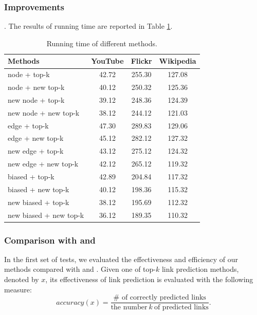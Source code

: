 {\subsubsection{Improvements}
. The results of running time are reported in Table \ref{tab_improvements}. \\
\begin{table}
\caption{Running time of different methods.}
\label{tab_improvements}
\vspace{-2ex}
\centering
\newcommand{\tabincell}[2]{\begin{tabular}{@{}#1@{}}#2\end{tabular}}
\begin{tabular}{l|c|c|c}
\hline \hline Methods & YouTube & Flickr & Wikipedia  \\
\hline \hline
node + top-k & 42.72 & 255.30 & 127.08 \\
node + new top-k & 40.12 & 250.32 & 125.36 \\
new node + top-k & 39.12 & 248.36 & 124.39 \\
new node + new top-k & 38.12 & 244.12 & 121.03 \\
\hline
edge + top-k & 47.30 & 289.83 & 129.06 \\
edge + new top-k & 45.12 & 282.12 & 127.32 \\
new edge + top-k & 43.12 & 275.12 & 124.32 \\
new edge + new top-k & 42.12 & 265.12 & 119.32 \\
\hline
biased + top-k & 42.89 & 204.84 & 117.32 \\
biased + new top-k & 40.12 & 198.36 & 115.32 \\
new biased + top-k & 38.12 & 195.69 & 112.32 \\
new biased + new top-k & 36.12 & 189.35 & 110.32 \\
\hline \hline
\end{tabular}
\end{table} }


\subsubsection{Comparison with \Aa and \BIGCLAM }



In the first set of tests,
we evaluated the effectiveness and efficiency of our methods compared with \Aa and
\BIGCLAM. Given one of top-$k$ link prediction methods, denoted by $x$, its effectiveness
of link prediction is evaluated with the following measure:
\begin{equation}
accuracy(x) = \frac{\# \textrm{ of correctly predicted links}}{\textrm{the number} \ k\ \textrm{of predicted links}}.
\end{equation}


